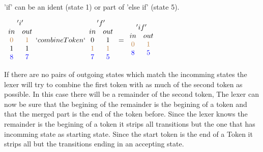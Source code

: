 \begin{example}\label{combTok}
'if' can be an ident (state 1) or part of 'else if' (state 5).
\begin{center}$\begin{array}{cc}
\multicolumn{2}{c}{'i'}\\
in & out\\
\textcolor{brown}{0} & \textcolor{brown}{1}\\
1 & 1\\
\textcolor{blue}{8} & \textcolor{blue}{7}\\
\end{array}
`combineToken`
\begin{array}{cc}\multicolumn{2}{c}{'f'}\\
in & out\\
0 & 1\\
\textcolor{brown}{1} & \textcolor{brown}{1}\\
\textcolor{blue}{7} & \textcolor{blue}{5}\\
\end{array}
=
\begin{array}{cc}\multicolumn{2}{c}{'if'}\\
in & out\\
\textcolor{brown}{0} & \textcolor{brown}{1}\\
\textcolor{blue}{8} & \textcolor{blue}{5}\\
\end{array}$\\
\end{center}
\end{example}
If there are no pairs of outgoing states which match the incomming states the
lexer will try to combine the first token with as much of the second token as
possible. In this case there will be a remainder of the second token, The lexer
can now be sure that the begining of the remainder is the begining of a token
and that the merged part is the end of the token before.
Since the lexer knows the remainder is the begining of a token it strips all
transitions but the one that has incomming state as starting state. Since the
start token is the end of a Token it strips all but the transitions ending in an
accepting state.
